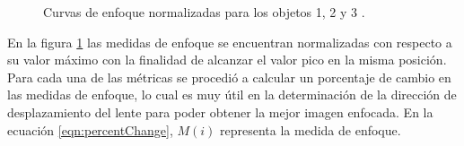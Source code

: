 \begin{figure}
 \centering
    \hfill
    \hfill
 \caption{Curvas de enfoque normalizadas para los objetos 1, 2 y 3 \citet{Subbarao1993}.}
 \label{subaraoSalidas}
\end{figure}




En la figura \ref{subaraoSalidas}  las medidas de enfoque se encuentran normalizadas con respecto a su valor máximo con la finalidad de alcanzar el valor pico en la misma posición.
\\

Para cada una de las métricas se procedió a calcular un porcentaje de cambio en las medidas de enfoque, lo cual es muy útil en la determinación de la dirección de desplazamiento del lente para poder obtener la mejor imagen enfocada. En la ecuación \ref{eqn:percentChange}, $M(i)$ representa la medida de enfoque.

